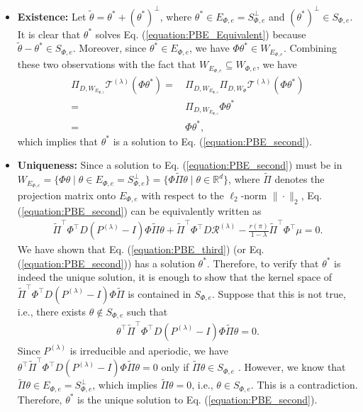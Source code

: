 \documentclass[11 pt]{article}
\begin{document}
	\begin{itemize}
		\item \textbf{Existence:} Let $\tilde{\theta}=\theta^*+(\theta^*)^\perp$, where $\theta^*\in E_{\Phi,e}=S_{\Phi,e}^\perp$ and $(\theta^*)^\perp \in S_{\Phi,e}$. It is clear that $\theta^*$ solves Eq. (\ref{equation:PBE_Equivalent}) because $\tilde{\theta}-\theta^*\in S_{\Phi,e}$. Moreover, since $\theta^*\in E_{\Phi,e}$, we have $\Phi\theta^* \in W_{E_{\Phi,e}}$. Combining these two observations with the fact that $W_{E_{\Phi,e}}\subseteq W_{\Phi,e}$, we have
		\begin{align*}
			\Pi_{D,W_{E_{\Phi, e}}}  \mathcal{T}^{(\lambda)} \left(\Phi \theta^*\right)=\,&\Pi_{D,W_{E_{\Phi, e}}} \Pi_{D,W_\Phi} \mathcal{T}^{(\lambda)} \left(\Phi \theta^*\right)\\
			=\,&\Pi_{D,W_{E_{\Phi, e}}}\Phi \theta^*\\
			=\,&\Phi \theta^*,
		\end{align*}
		which implies that $\theta^*$ is a solution to Eq. (\ref{equation:PBE_second}).
		
		\item \textbf{Uniqueness:} Since a solution to Eq. (\ref{equation:PBE_second}) must be in $W_{E_{\Phi,e}}=\{\Phi\theta \mid \theta\in E_{\Phi,e}=S_{\Phi,e}^\perp\}=\{\Phi\tilde{\Pi}\theta \mid \theta\in \mathbb{R}^d\}$, where $\tilde{\Pi}$ denotes the projection matrix onto $E_{\Phi,e}$ with respect to the $\ell_2$-norm $\|\cdot\|_2$, Eq. (\ref{equation:PBE_second}) can be equivalently written as
		\begin{align}\label{equation:PBE_third}
			\tilde{\Pi}^\top \Phi^\top D(P^{(\lambda)}-I)\Phi\tilde{\Pi}\theta+\tilde{\Pi}^\top \Phi^\top D\mathcal{R}^{(\lambda)}-\frac{r(\pi)}{1-\lambda}\tilde{\Pi}^\top \Phi^\top \mu=0.
		\end{align}
		We have shown that Eq. (\ref{equation:PBE_third}) (or Eq. (\ref{equation:PBE_second})) has a solution $\theta^*$. Therefore, to verify that $\theta^*$ is indeed the unique solution, it is enough to show that the kernel space of $\tilde{\Pi}^\top \Phi^\top D(P^{(\lambda)}-I)\Phi \tilde{\Pi}$ is contained in $S_{\Phi,e}$. Suppose that this is not true, i.e., there exists $\theta\notin S_{\Phi,e}$ such that
		\begin{align*}
			\theta^\top \tilde{\Pi}^\top \Phi^\top D(P^{(\lambda)}-I)\Phi\tilde{\Pi}\theta=0.
		\end{align*}
		Since $P^{(\lambda)}$ is irreducible and aperiodic, we have $\theta^\top \tilde{\Pi}^\top \Phi^\top D(P^{(\lambda)}-I)\Phi\tilde{\Pi}\theta=0$ only if $\tilde{\Pi}\theta \in  S_{\Phi,e} $ \cite[Lemma 7]{tsitsiklis1999average}. However, we know that $\tilde{\Pi}\theta \in E_{\Phi,e}=S_{\Phi,e}^\perp$, which implies $\tilde{\Pi} \theta=0$, i.e., $\theta \in S_{\Phi,e}$. This is a contradiction. Therefore, $\theta^*$ is the unique solution to Eq. (\ref{equation:PBE_second}).
	\end{itemize}
	
\end{document}
